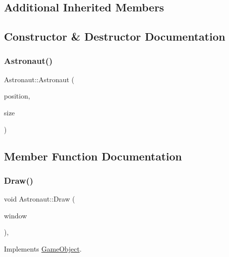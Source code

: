 \subsection*{Additional Inherited Members}


\subsection{Constructor \& Destructor Documentation}
\hypertarget{class_astronaut_a2c973afff53a1eca7b857b6d1dd8ba2f}{}\label{class_astronaut_a2c973afff53a1eca7b857b6d1dd8ba2f} 
\subsubsection{\texorpdfstring{Astronaut()}{Astronaut()}}
{\footnotesize\ttfamily Astronaut\+::\+Astronaut (\begin{DoxyParamCaption}\item[{sf\+::\+Vector2f}]{position,  }\item[{sf\+::\+Vector2f}]{size }\end{DoxyParamCaption})}



\subsection{Member Function Documentation}
\hypertarget{class_astronaut_ad87f989c99c64de938c367865cd196c4}{}\label{class_astronaut_ad87f989c99c64de938c367865cd196c4} 
\subsubsection{\texorpdfstring{Draw()}{Draw()}}
{\footnotesize\ttfamily void Astronaut\+::\+Draw (\begin{DoxyParamCaption}\item[{sf\+::\+Render\+Window \&}]{window }\end{DoxyParamCaption})\hspace{0.3cm}{\ttfamily [override]}, {\ttfamily [virtual]}}



Implements \hyperlink{class_game_object_a0bd45eb831b3d0959eb498cad3e412ce}{Game\+Object}.

\hypertarget{class_astronaut_ab37c4cce5348d86be1ec5ee652f5c917}{}\label{class_astronaut_ab37c4cce5348d86be1ec5ee652f5c917} 
